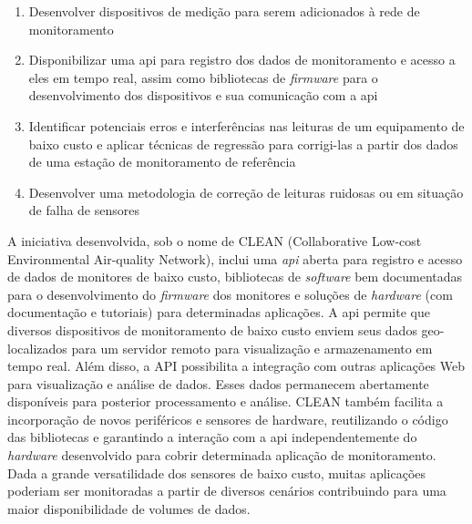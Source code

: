 \begin{enumerate}
    \item Desenvolver dispositivos de medição para serem adicionados à rede de monitoramento
    \item Disponibilizar uma \acrshort{api} para registro dos dados de monitoramento e acesso a eles em tempo real, assim como bibliotecas de \textit{firmware} para o desenvolvimento dos dispositivos e sua comunicação com a \acrshort{api}
    \item Identificar potenciais erros e interferências nas leituras de um equipamento de baixo custo e aplicar técnicas de regressão para corrigi-las a partir dos dados de uma estação de monitoramento de referência
    \item Desenvolver uma metodologia de correção de leituras ruidosas ou em situação de falha de sensores
\end{enumerate}

A iniciativa desenvolvida, sob o nome de CLEAN (Collaborative Low-cost Environmental Air-quality Network), inclui uma \textit{api} aberta para registro e acesso de dados de monitores de baixo custo, bibliotecas de \textit{software} bem documentadas para o desenvolvimento do \textit{firmware} dos monitores e soluções de \textit{hardware} (com documentação e tutoriais) para determinadas aplicações. A \acrshort{api} permite que diversos dispositivos de monitoramento de baixo custo enviem seus dados geo-localizados para um servidor remoto para visualização e armazenamento em tempo real. Além disso, a API possibilita a integração com outras aplicações Web para visualização e análise de dados. Esses dados permanecem abertamente disponíveis para posterior processamento e análise. CLEAN também facilita a incorporação de novos periféricos e sensores de hardware, reutilizando o código das bibliotecas e garantindo a interação com a \acrshort{api} independentemente do \textit{hardware} desenvolvido para cobrir determinada aplicação de monitoramento. Dada a grande versatilidade dos sensores de baixo custo, muitas aplicações poderiam ser monitoradas a partir de diversos cenários contribuindo para uma maior disponibilidade de volumes de dados.

